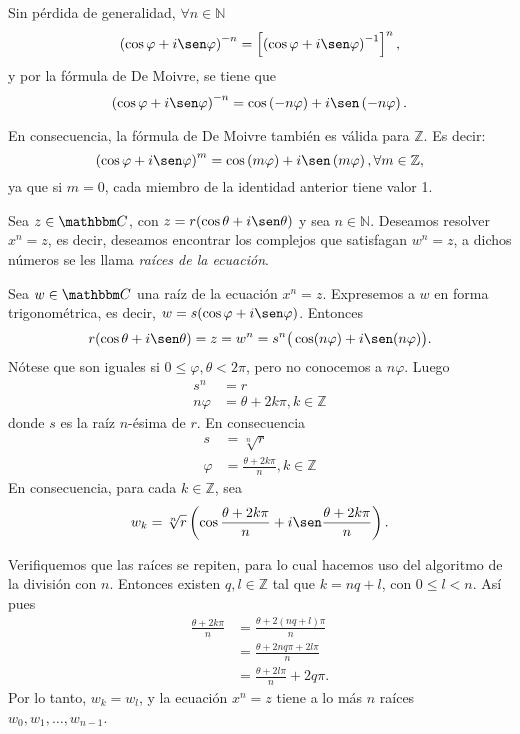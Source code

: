Sin pérdida de generalidad, $\forall n \in \mathbb{N}$
$$\left( \cos \varphi +i \sen \varphi \right)^{-n}=\left[ \left( \cos \varphi +i \sen \varphi \right)^{-1} \right]^n,$$
y por la fórmula de De Moivre, se tiene que
$$\left( \cos \varphi +i \sen \varphi \right)^{-n}=\cos \left( -n \varphi \right) +i \sen \left( -n\varphi \right).$$

En consecuencia, la fórmula de De Moivre también es válida para $\mathbb{Z}$. Es decir:
$$\left( \cos \varphi +i \sen \varphi \right)^{m}=\cos \left( m \varphi \right) +i \sen \left( m \varphi \right),  \forall m \in \mathbb{Z},$$
ya que si $m=0$, cada miembro de la identidad anterior tiene valor 1.

\newpage

Sea $z \in \CC$, con $z=r(\cos \theta +i \sen \theta )$ y sea $n \in \mathbb{N}$. Deseamos resolver $x^n=z$, es decir, deseamos encontrar los complejos que satisfagan $w^n=z$, a dichos números se les llama \textit{raíces de la ecuación}.

Sea $w \in \CC$ una raíz de la ecuación $x^n=z$. Expresemos a $w$ en forma trigonométrica, es decir, $w=s(\cos \varphi +i \sen \varphi )$. Entonces
$$r( \cos \theta +i \sen \theta )=z=w^n=s^n\big( \cos (n \varphi )+i \sen (n \varphi ) \big).$$
Nótese que son iguales si $0 \leq \varphi ,  \theta <2 \pi$, pero no conocemos a $n \varphi$. Luego
\begin{align*}
    s^n &=r \\
    n \varphi &=\theta +2k \pi,  k \in \mathbb{Z}
\end{align*}
donde $s$ es la raíz $n$-ésima de $r$. En consecuencia
\begin{align*}
    s &=\sqrt[n]{r} \\
    \varphi &=\frac{\theta +2k \pi}{n},  k \in \mathbb{Z}
\end{align*}
En consecuencia, para cada $k \in \mathbb{Z}$, sea
$$w_k=\sqrt[n]{r} \left( \cos \frac{\theta +2k\pi}{n} +i \sen \frac{\theta +2k\pi}{n} \right).$$

Verifiquemos que las raíces se repiten, para lo cual hacemos uso del algoritmo de la división con $n$. Entonces existen $q,  l \in \mathbb{Z}$ tal que $k=nq+l$, con $0 \leq l <n$. Así pues
\begin{align*}
    \frac{\theta +2k\pi}{n} &=\frac{\theta +2(nq+l)\pi}{n} \\
    &=\frac{\theta +2nq\pi +2l\pi}{n} \\
    &=\frac{\theta +2l\pi}{n}+2q\pi .
\end{align*}
Por lo tanto, $w_k=w_l$, y la ecuación $x^n=z$ tiene a lo más $n$ raíces $w_0,  w_1,  \dots,  w_{n-1}$.

